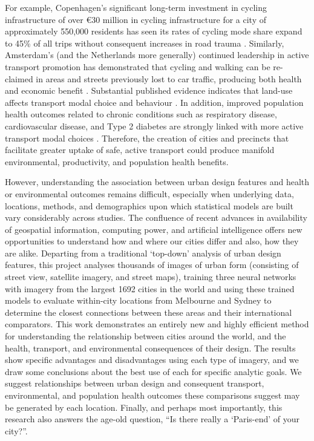 \documentclass[sageh,times]{sagej}
\begin{document}
For example, Copenhagen's significant long-term investment in cycling infrastructure of over \euro 30 million in cycling infrastructure for a city of approximately 550,000 residents has seen its rates of cycling mode share expand to 45\% of all trips without consequent increases in road trauma \citep{Kaplan2014}. Similarly, Amsterdam's (and the Netherlands more generally) continued leadership in active transport promotion has demonstrated that cycling and walking can be re-claimed in areas and streets previously lost to car traffic, producing both health and economic benefit \citep{Andersen2000}. Substantial published evidence indicates that land-use affects transport modal choice and behaviour  \citep{Giles-corti2016,Kleinert2016,Goenka2016}. In addition, improved population health outcomes related to chronic conditions such as respiratory disease, cardiovascular disease, and Type 2 diabetes are strongly linked with more active transport modal choices  \citep{Zapata-Diomedi2017}. Therefore, the creation of cities and precincts that facilitate greater uptake of safe, active transport could produce manifold environmental, productivity, and population health benefits. 

However, understanding the association between urban design features and health or environmental outcomes remains difficult, especially when underlying data, locations, methods, and demographics upon which statistical models are built vary considerably across studies. The confluence of recent advances in availability of geospatial information, computing power, and artificial intelligence offers new opportunities to understand how and where our cities differ and also, how they are alike. Departing from a traditional `top-down' analysis of urban design features, this project analyses thousands of images of urban form (consisting of street view, satellite imagery, and street maps), training three neural networks with imagery from the largest 1692 cities in the world and using these trained models to evaluate within-city locations from Melbourne and Sydney to determine the closest connections between these areas and their international comparators. This work demonstrates an entirely new and highly efficient method for understanding the relationship between cities around the world, and the health, transport, and environmental consequences of their design. The results show specific advantages and disadvantages using each type of imagery, and we draw some conclusions about the best use of each for specific analytic goals. We suggest relationships between urban design and consequent transport, environmental, and population health outcomes these comparisons suggest may be generated by each location. Finally, and perhaps most importantly, this research also answers the age-old question, ``Is there really a `Paris-end' of your city?''.
\end{document}
